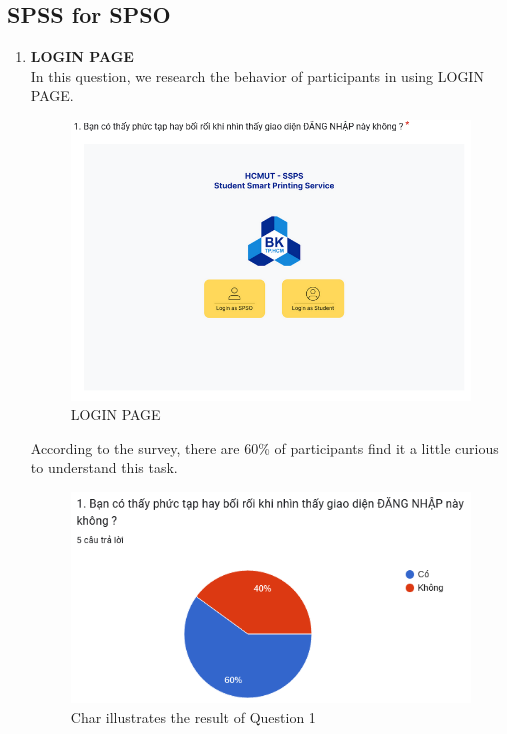 \subsection{SPSS for SPSO}
\begin{enumerate}
    \item \textbf{LOGIN PAGE} \\
    In this question, we research the behavior of participants in using LOGIN PAGE.
\begin{figure}[!h]
    \centering
    \includegraphics[width=0.8\linewidth]{images/image_uasbility/Q1_SPSO.png}
    \caption{LOGIN PAGE}
    \label{fig:LOGIN PAGE}
\end{figure}
\newpage
According to the survey, there are 60\% of participants find it a little curious to understand this task.
\begin{figure}[!h]
    \centering
    \includegraphics[width=0.8\linewidth]{images/image_uasbility/A1_SPSO.png}
    \caption{Char illustrates the result of Question 1}
    \label{fig:Chat illustrates the results of Question 1}
\end{figure}



\end{enumerate}
